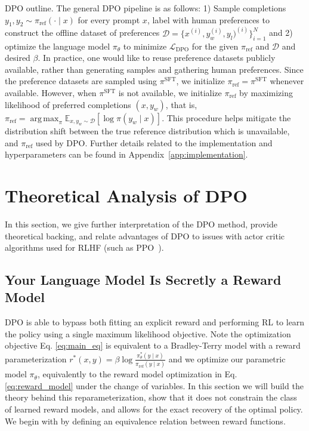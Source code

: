 \documentclass{article}
\DeclareMathOperator*{\argmax}{arg\,max}
\begin{document}
DPO outline.
The general DPO pipeline is as follows: 1) Sample completions $y_1, y_2 \sim \pi_\text{ref}(\cdot \mid x)$ for every prompt $x$, label with human preferences to construct the offline dataset of preferences $\mathcal{D} = \{x^{(i)}, y_w^{(i)}, y_l)^{(i)}\}_{i=1}^N$ and 2) optimize the language model $\pi_\theta$ to minimize $\mathcal{L}_\text{DPO}$ for the given $\pi_\text{ref}$ and $\mathcal{D}$ and desired $\beta$.
In practice, one would like to reuse preference datasets publicly available, rather than generating samples and gathering human preferences. Since the preference datasets are sampled using $\pi^\text{SFT}$, we initialize $\pi_\text{ref} = \pi^\text{SFT}$ whenever available. However, when $\pi^\text{SFT}$ is not available, we initialize $\pi_\text{ref}$ by maximizing likelihood of preferred completions ${(x, y_w)}$, that is, ${\pi_\text{ref} = \argmax_{\pi}\mathbb{E}_{x, y_w \sim \mathcal{D}}\left[\log \pi(y_w \mid x)\right]}$. This procedure helps mitigate the distribution shift between the true reference distribution which is unavailable, and $\pi_\text{ref}$ used by DPO. Further details related to the implementation and hyperparameters can be found in Appendix~\ref{app:implementation}.

\section{Theoretical Analysis of DPO}
In this section, we give further interpretation of the DPO method, provide theoretical backing, and relate advantages of DPO to issues with actor critic algorithms used for RLHF (such as PPO~\cite{schulman2017proximal}).

\label{sec:theory}

\subsection{Your Language Model Is Secretly a Reward Model} DPO is able to bypass both fitting an explicit reward and performing RL to learn the policy using a single maximum likelihood objective. Note the optimization objective Eq. \ref{eq:main_eq} is equivalent to a Bradley-Terry model with a reward parameterization $r^*(x, y) = \beta \log\frac{\pi^*_\theta(y \mid x)}{\pi_\text{ref}(y \mid x)}$ and we optimize our parametric model $\pi_{\theta}$, equivalently to the reward model optimization in Eq. \ref{eq:reward_model} under the change of variables. In this section we will build the theory behind this reparameterization, show that it does not constrain the class of learned reward models, and allows for the exact recovery of the optimal policy. We begin with by defining an equivalence relation between reward functions.
\end{document}
